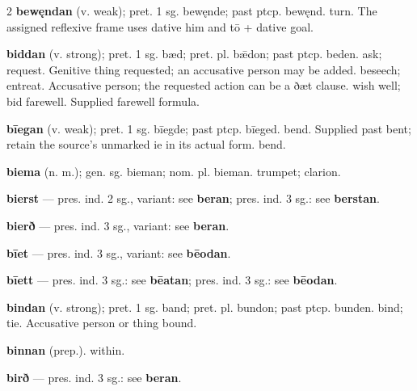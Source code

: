 \begin{multicols*}{2}
\textbf{bewęndan} (v. weak); pret. 1 sg. bewęnde; past ptcp. bewęnd. turn. The assigned reflexive frame uses dative him and tō + dative goal.\par
\textbf{biddan} (v. strong); pret. 1 sg. bæd; pret. pl. bǣdon; past ptcp. beden. ask; request. Genitive thing requested; an accusative person may be added. beseech; entreat. Accusative person; the requested action can be a ðæt clause. wish well; bid farewell. Supplied farewell formula.\par
\textbf{bīegan} (v. weak); pret. 1 sg. bīegde; past ptcp. bīeged. bend. Supplied past bent; retain the source's unmarked ie in its actual form. bend.\par
\textbf{biema} (n. m.); gen. sg. bieman; nom. pl. bieman. trumpet; clarion.\par
\textbf{bierst} — pres. ind. 2 sg., variant: see \textbf{beran}; pres. ind. 3 sg.: see \textbf{berstan}.\par
\textbf{bierð} — pres. ind. 3 sg., variant: see \textbf{beran}.\par
\textbf{bīet} — pres. ind. 3 sg., variant: see \textbf{bēodan}.\par
\textbf{bīett} — pres. ind. 3 sg.: see \textbf{bēatan}; pres. ind. 3 sg.: see \textbf{bēodan}.\par
\textbf{bindan} (v. strong); pret. 1 sg. band; pret. pl. bundon; past ptcp. bunden. bind; tie. Accusative person or thing bound.\par
\textbf{binnan} (prep.). within.\par
\textbf{birð} — pres. ind. 3 sg.: see \textbf{beran}.\par

\end{multicols*}
